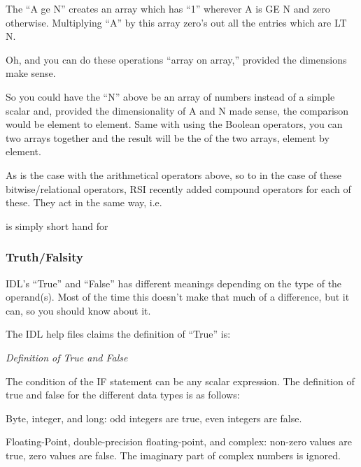 
  The ``A ge N'' creates an array which has ``1'' wherever A is GE N
  and zero otherwise. Multiplying ``A'' by this array zero's out all
  the entries which are LT N.


  Oh, and you can do these operations ``array on array,'' provided the
  dimensions make sense.

  So you could have the ``N'' above be an array of numbers instead of
  a simple scalar and, provided the dimensionality of A and N made
  sense, the comparison would be element to element. Same with using
  the Boolean operators, you can  two arrays together and the
  result will be the  of the two arrays, element by element.

  As is the case with the arithmetical operators above, so to in the
  case of these bitwise/relational operators, RSI recently added
  compound operators for each of these. They act in the same way, i.e.

 
  is simply short hand for


  \subsubsection{Truth/Falsity}\label{sec:qs-Truth}

   IDL's ``True'' and ``False'' has different meanings depending on
  the type of the operand(s). Most of the time this doesn't make that
  much of a difference, but it can, so you should know about it.

  The IDL help files claims the definition of ``True'' is:



  \slshape
   Definition of True and False


  The condition of the IF statement can be any scalar expression. The
  definition of true and false for the different data types is as
  follows:

  \bi

   \item Byte, integer, and long: odd integers are true, even integers are false.


   \item Floating-Point, double-precision floating-point, and complex:
  non-zero values are true, zero values are false. The imaginary part
  of complex numbers is ignored.


